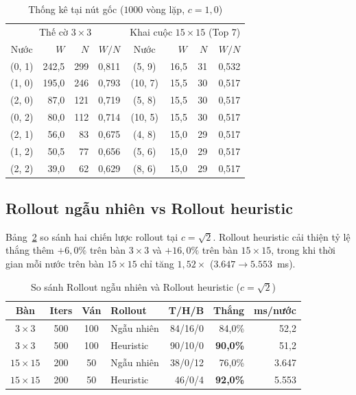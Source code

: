 \documentclass[conference]{IEEEtran}
\begin{document}
\begin{table}[t]
\centering
\caption{Thống kê tại nút gốc ($1000$ vòng lặp, $c = 1{,}0$)}
\label{tab:root_stats}
\begin{tabular}{@{}crrr|crrr@{}}
\toprule
\multicolumn{4}{c|}{Thế cờ $3\times 3$} & \multicolumn{4}{c}{Khai cuộc $15\times 15$ (Top 7)} \\
Nước & $W$ & $N$ & $W/N$ & Nước & $W$ & $N$ & $W/N$ \\
\midrule
(0, 1) & 242,5 & 299 & 0,811 & (5, 9) & 16,5 & 31 & 0,532 \\
(1, 0) & 195,0 & 246 & 0,793 & (10, 7) & 15,5 & 30 & 0,517 \\
(2, 0) & 87,0 & 121 & 0,719 & (5, 8) & 15,5 & 30 & 0,517 \\
(0, 2) & 80,0 & 112 & 0,714 & (10, 5) & 15,5 & 30 & 0,517 \\
(2, 1) & 56,0 & 83 & 0,675 & (4, 8) & 15,0 & 29 & 0,517 \\
(1, 2) & 50,5 & 77 & 0,656 & (5, 6) & 15,0 & 29 & 0,517 \\
(2, 2) & 39,0 & 62 & 0,629 & (8, 6) & 15,0 & 29 & 0,517 \\
\bottomrule
\end{tabular}
\end{table}

\subsection{Rollout ngẫu nhiên vs Rollout heuristic}
Bảng~\ref{tab:rollout} so sánh hai chiến lược rollout tại $c = \sqrt{2}$. Rollout heuristic cải thiện tỷ lệ thắng thêm $+6{,}0\%$ trên bàn $3\times 3$ và $+16{,}0\%$ trên bàn $15\times 15$, trong khi thời gian mỗi nước trên bàn $15\times 15$ chỉ tăng $1{,}52\times$ ($3.647 \rightarrow 5.553$~ms).

\begin{table}[t]
\centering
\caption{So sánh Rollout ngẫu nhiên và Rollout heuristic ($c = \sqrt{2}$)}
\label{tab:rollout}
\setlength{\tabcolsep}{4pt}
\begin{tabular}{@{}ccclrrr@{}}
\toprule
Bàn & Iters & Ván & Rollout & T/H/B & Thắng & ms/nước \\
\midrule
$3\times 3$ & 500 & 100 & Ngẫu nhiên & 84/16/0 & 84,0\% & 52,2 \\
$3\times 3$ & 500 & 100 & Heuristic & 90/10/0 & \textbf{90,0\%} & 51,2 \\
\midrule
$15\times 15$ & 200 & 50 & Ngẫu nhiên & 38/0/12 & 76,0\% & 3.647 \\
$15\times 15$ & 200 & 50 & Heuristic & 46/0/4 & \textbf{92,0\%} & 5.553 \\
\bottomrule
\end{tabular}
\end{table}
\end{document}
